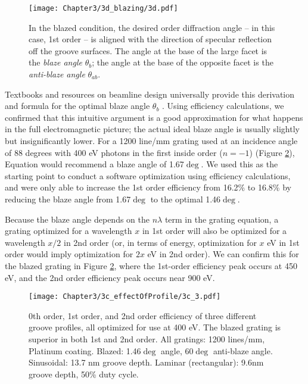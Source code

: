 \begin{figure}[htbp] %
   \centering
   \texttt{[image: Chapter3/3d\_blazing/3d.pdf]} 
   \caption{In the blazed condition, the desired order diffraction angle -- in this case, 1st order -- is aligned with the direction of specular reflection off the groove surfaces.  The angle at the base of the large facet is the \emph{blaze angle} $\theta_b$; the angle at the base of the opposite facet is the \emph{anti-blaze angle} $\theta_{ab}$.}
   \label{3d}
\end{figure}

Textbooks and resources on beamline design universally provide this derivation and formula for the optimal blaze angle $\theta_b$ \cite[page 4-17]{Tho01} \cite[Section 9.1]{Pal05} \cite{Pea97}.  Using efficiency calculations, we confirmed that this intuitive argument is a good approximation for what happens in the full electromagnetic picture; the actual ideal blaze angle is usually slightly but insignificantly lower.  For a 1200 line/mm grating used at an incidence angle of 88 degrees with 400 eV photons in the first inside order ($n=-1$) (Figure \ref{3c-plot}), Equation  would recommend a blaze angle of 1.67$\deg$.  We used this as the starting point to conduct a software optimization using efficiency calculations, and were only able to increase the 1st order efficiency from 16.2\% to 16.8\% by reducing the blaze angle from 1.67$\deg$ to the optimal 1.46$\deg$.

Because the blaze angle depends on the $n \lambda$ term in the grating equation, a grating optimized for a wavelength $x$ in 1st order will also be optimized for a wavelength $x/2$ in 2nd order (or, in terms of energy, optimization for $x$ eV in 1st order would imply optimization for $2x$ eV in 2nd order).  We can confirm this for the blazed grating in Figure \ref{3c-plot}, where the 1st-order efficiency peak occurs at 450 eV, and the 2nd order efficiency peak occurs near 900 eV.

\begin{figure}[htbp] %
   \centering
   \texttt{[image: Chapter3/3c\_effectOfProfile/3c\_3.pdf]} 
   \caption[0th order, 1st order, and 2nd order efficiency of three different groove profiles, all optimized for use at 400 eV.]{0th order, 1st order, and 2nd order efficiency of three different groove profiles, all optimized for use at 400 eV.  The blazed grating is superior in both 1st and 2nd order.  All gratings: 1200 lines/mm, Platinum coating.  Blazed: 1.46$\deg$ angle, 60$\deg$ anti-blaze angle.  Sinusoidal: 13.7 nm groove depth.  Laminar (rectangular): 9.6nm groove depth, 50\% duty cycle. }
   \label{3c-plot}
\end{figure}

